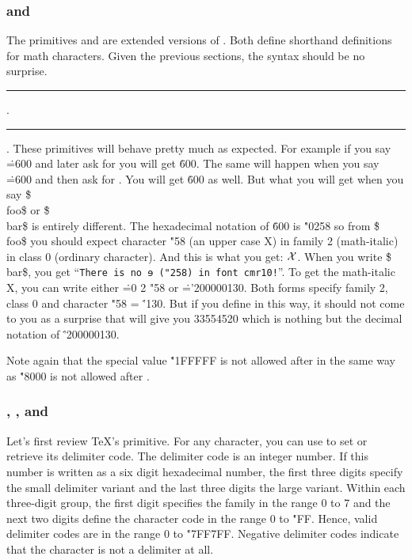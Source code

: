 \subsubsection{ and }
The primitives  and  are extended versions
of . Both define shorthand definitions for math characters.
Given the previous sections, the syntax should be no surprise.
\medskip
\rule{}: \opt{\.{=}} .
\rule{}: \opt{\.{=}}
     .
\medskip
These primitives will behave pretty much as expected. For example if you say
\.{=600} and later ask for  you will get \.{600}.
The same will happen when you say \.{=600} and then
ask for . You will get \.{600} as well.
But what you will get when you say \.{\$\\foo\$}  or \.{\$\\bar\$} is entirely different.
The hexadecimal notation of \.{600} is \.{"0258} so from \.{\$\\foo\$} you should expect
character \.{"58} (an upper case X) in family 2 (math-italic) in class 0 (ordinary character).
And this is what you get: $\mathchar"0258$.
When you write  \.{\$\\bar\$}, you get ``{\tt There is no {\utf ɘ} ("258) in font cmr10!}''.
To get the math-italic X, you can write either
\.{=0 2 "58} or  \.{='200000130}.
Both forms specify family 2, class 0 and character \.{"58} = \.{'130}.
But if you define  in this way, it should not come to you as a surprise that
 will give you 33554520 which is nothing but the decimal notation of \.{'200000130}.

Note again that the special  value \.{"1FFFFF} is not allowed after 
in the same way as \.{"8000} is not allowed after .


\subsubsection{, , and }

Let's first review \TeX's  primitive.
For any character, you can use  to set or retrieve its delimiter code.
The delimiter code is an integer number.
If this number is written as a six digit hexadecimal number,
the first three digits specify the small delimiter variant and
the last three digits the large variant.
Within each three-digit group, the first digit specifies the family in the range 0 to 7
and the next two digits define the character code in the range 0 to \.{"FF}.
Hence, valid delimiter codes are in the range 0 to \.{"7FF7FF}.
Negative delimiter codes indicate that the character is not a delimiter at all.

